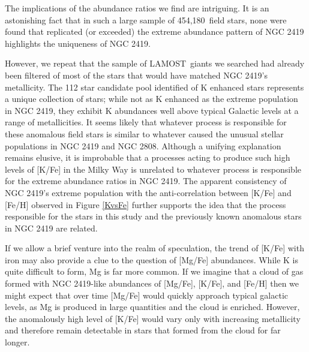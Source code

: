 \documentclass[a4paper,fleqn,usenatbib]{mnras}
\newcommand{\LamostGiants}{454,180}
\newcommand{\project}[1]{#1}
\newcommand{\lamost}{\project{LAMOST}}
\begin{document}
The implications of the abundance ratios we find are intriguing. It is an astonishing fact that in such a large sample of \LamostGiants\ field stars, none were found that replicated (or exceeded) the extreme abundance pattern of NGC 2419 highlights the uniqueness of NGC 2419.

However, we repeat that the sample of \lamost\ giants  we searched had already been filtered of most of the stars that would have matched NGC 2419's metallicity. The 112 star candidate pool identified of K enhanced stars represents a unique collection of stars; while not as K enhanced as the extreme population in NGC 2419, they exhibit K abundances well above typical Galactic levels at a range of metallicities. It seems likely that whatever process is responsible for these anomalous field stars is similar to whatever caused the unusual stellar populations in NGC 2419 and NGC 2808.  Although a unifying explanation remains elusive, it is improbable that a processes acting to produce such high levels of [K/Fe] in the Milky Way is unrelated to whatever process is responsible for the extreme abundance ratios in NGC 2419. The apparent consistency of NGC 2419's extreme population with the anti-correlation between [K/Fe] and [Fe/H] observed in Figure \ref{KvsFe} further supports the idea that the process responsible for the stars in this study and the previously known anomalous stars in NGC 2419 are related.

If we allow a brief venture into the realm of speculation, the trend of [K/Fe] with iron may also provide a clue to the question of [Mg/Fe] abundances. While K is quite difficult to form, Mg is far more common. If we imagine that a cloud of gas formed with NGC 2419-like abundances of [Mg/Fe], [K/Fe], and [Fe/H] then we might expect that over time [Mg/Fe] would quickly approach typical galactic levels, as Mg is produced in large quantities and the cloud is enriched. However, the anomalously high level of [K/Fe] would vary only with increasing metallicity and therefore remain detectable in stars that formed from the cloud for far longer.

\end{document}
